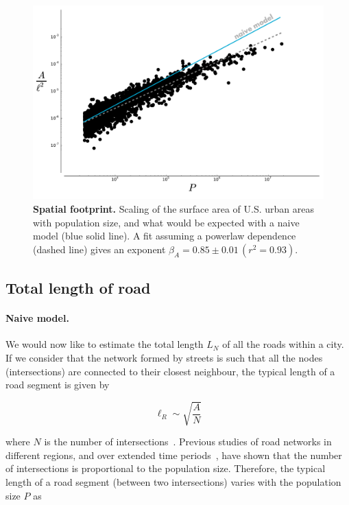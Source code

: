 \begin{figure}[!h]
    \centering
    \includegraphics[width=\textwidth]{gfx/chapter-scaling/scaling_area.pdf}
    \caption{{\bf Spatial footprint.} Scaling of the surface area of U.S. urban areas with population size,
        and what would be expected with a naive model (blue solid line).
    A fit assuming a powerlaw dependence (dashed line) gives an exponent
    $\beta_A = 0.85 \pm 0.01\,(r^2 = 0.93)$.\label{fig:scaling_area}}
\end{figure}



\subsection{Total length of road}
\label{sub:total_length_of_road}

\paragraph{Naive model.} We would now like to estimate the total length $L_N$ of all the roads within a
city. If we consider that the network formed by streets is such that all the
nodes (intersections) are connected to their closest neighbour, the typical
length of a road segment is given by

\begin{equation}
    \ell_R \sim \sqrt{\frac{A}{N}}
\end{equation}

where $N$ is the number of intersections~\cite{Barthelemy:2008}. Previous studies of road networks in
different regions, and over extended time
periods~\cite{Strano:2012,Barthelemy:2013}, have shown that the number of
intersections is proportional to the population size. Therefore, the typical
length of a road segment (between two intersections) varies with the population
size $P$ as

